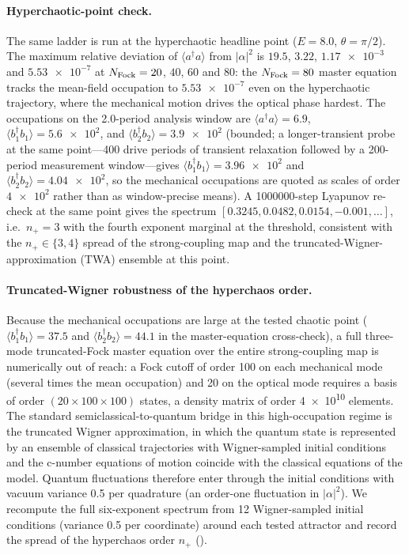 \documentclass[preprint,numbers,a4paper]{elsarticle}
\begin{document}
\paragraph{Hyperchaotic-point check.}
The same ladder is run at the hyperchaotic headline point ($E=\num{8.0}$, $\theta=\pi/2$). The maximum relative deviation of $\langle a^\dagger a\rangle$ from $|\alpha|^2$ is $\num{19.5}$, $\num{3.22}$, $\num{1.17e-3}$ and $\num{5.53e-7}$ at $N_{\rm Fock}=\num{20}$, $\num{40}$, $\num{60}$ and $\num{80}$: the $N_{\rm Fock}=\num{80}$ master equation tracks the mean-field occupation to $\num{5.53e-7}$ even on the hyperchaotic trajectory, where the mechanical motion drives the optical phase hardest. The occupations on the \num{2.0}-period analysis window are $\langle a^\dagger a\rangle=\num{6.9}$, $\langle b_1^\dagger b_1\rangle=\num{5.6e2}$, and $\langle b_2^\dagger b_2\rangle=\num{3.9e2}$ (bounded; a longer-transient probe at the same point---\num{400} drive periods of transient relaxation followed by a \num{200}-period measurement window---gives $\langle b_1^\dagger b_1\rangle=\num{3.96e2}$ and $\langle b_2^\dagger b_2\rangle=\num{4.04e2}$, so the mechanical occupations are quoted as scales of order $\num{4e2}$ rather than as window-precise means). A \num{1000000}-step Lyapunov re-check at the same point gives the spectrum $[\num{0.3245},\num{0.0482},\num{0.0154}, \num{-0.001},\dots]$, i.e.\ $n_+=3$ with the fourth exponent marginal at the threshold, consistent with the $n_+\in\{3,4\}$ spread of the strong-coupling map and the truncated-Wigner-approximation (TWA) ensemble at this point.

\paragraph{Truncated-Wigner robustness of the hyperchaos order.}
Because the mechanical occupations are large at the tested chaotic point ($\langle b_1^\dagger b_1\rangle=\num{37.5}$ and $\langle b_2^\dagger b_2\rangle=\num{44.1}$ in the master-equation cross-check), a full three-mode truncated-Fock master equation over the entire strong-coupling map is numerically out of reach: a Fock cutoff of order \num{100} on each mechanical mode (several times the mean occupation) and \num{20} on the optical mode requires a basis of order $(20\times100\times100)$ states, a density matrix of order \num{4e10} elements. The standard semiclassical-to-quantum bridge in this high-occupation regime is the truncated Wigner approximation, in which the quantum state is represented by an ensemble of classical trajectories with Wigner-sampled initial conditions and the c-number equations of motion coincide with the classical equations of the model. Quantum fluctuations therefore enter through the initial conditions with vacuum variance \num{0.5} per quadrature (an order-one fluctuation in $|\alpha|^2$). We recompute the full six-exponent spectrum from \num{12} Wigner-sampled initial conditions (variance \num{0.5} per coordinate) around each tested attractor and record the spread of the hyperchaos order $n_+$ ().
\end{document}
